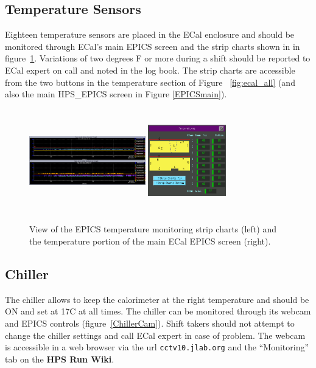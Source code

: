 \documentclass[12pt]{article}
\begin{document}
\subsection{Temperature Sensors}
Eighteen temperature sensors are placed in the ECal enclosure and should be monitored through ECal's main EPICS screen and the strip charts shown in in figure~\ref{temp2}. Variations of two degrees F or more during a shift should be reported to ECal expert on call and noted in the log book.  The strip charts are accessible from the two buttons in the temperature section of Figure ~\ref{fig:ecal_all} (and also the main HPS\_EPICS screen in Figure \ref{EPICSmain}).
\begin{figure}[htbp]
\center
\includegraphics[width=0.45\textwidth,height=4.5cm]{pics/ECal_temp_s.png}
\includegraphics[width=0.3\textwidth,height=4.5cm]{pics/epics_ecal_temp.png}
\caption{\label{temp2} View of the EPICS temperature monitoring strip charts (left) and the temperature portion of the main ECal EPICS screen (right).}
\end{figure}

\subsection{Chiller}
         The chiller allows to keep the calorimeter at the right temperature and should be ON and set at 17C at all times. The chiller can be monitored through its webcam and EPICS controls (figure~\ref{ChillerCam}). Shift takers should not attempt to change the chiller settings and call ECal expert in case of problem.  The webcam is accessible in a web browser via the url \texttt{cctv10.jlab.org} and the ``Monitoring'' tab on the {\bf HPS Run Wiki}.
\end{document}
